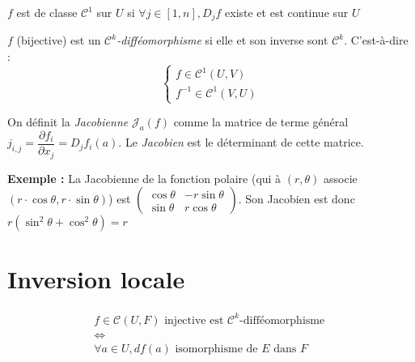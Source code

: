 \documentclass[11pt,a4paper,fleqn,pdftex]{report}
\begin{document}
\begin{dfn}
$f$ est de classe $\mathcal{C}^1$ sur $U$ si $\forall j \in [1,n], D_jf$ existe et est continue sur $U$
\end{dfn}


\begin{dfn}
$f$ (bijective) est un \emph{$\mathcal{C}^k$-difféomorphisme} si elle et son inverse sont $\mathcal{C}^k$. C'est-à-dire : 
\[
\left\lbrace
\begin{array}{l}
f \in \mathcal{C}^1\left( U,V \right) \\
f^{-1} \in \mathcal{C}^1\left( V,U \right)
\end{array}
\right.
\]
\end{dfn}

\begin{dfn}
On définit la \emph{Jacobienne} $\mathcal{J}_a(f)$ comme la matrice de terme général $j_{i,j}=\dfrac{\partial f_i}{\partial x_j}=D_jf_i(a)$. \newline
Le \emph{Jacobien} est le déterminant de cette matrice.
\end{dfn}

\textbf{Exemple :} La Jacobienne de la fonction polaire (qui à $(r,\theta )$ associe $(r\cdot \cos{\theta} , r\cdot \sin{\theta} )$) est $\begin{pmatrix}
\cos{\theta} & -r\sin{\theta} \\
\sin{\theta} & r\cos{\theta}
\end{pmatrix}$. Son Jacobien est donc $r\left( \sin^2{\theta} + \cos^2{\theta} \right)=r$

\section{Inversion locale}
\begin{itheorem}
\[
\begin{array}{c}
f \in \mathcal{C}(U,F)\text{ injective est }\mathcal{C}^k\text{-difféomorphisme } \\ 
    \Leftrightarrow \\
 \forall a \in U, df(a) \text{ isomorphisme de }E\text{ dans }F
\end{array}
\]
\end{itheorem}
\end{document}
